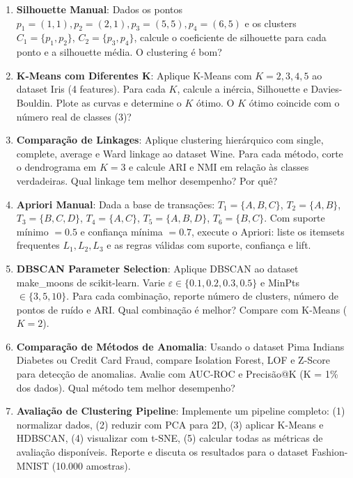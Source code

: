 \documentclass[12pt,a4paper]{article}
\begin{document}
\begin{enumerate}
  \item \textbf{Silhouette Manual}: Dados os pontos $p_1=(1,1), p_2=(2,1), p_3=(5,5), p_4=(6,5)$ e os clusters $C_1 = \{p_1, p_2\}$, $C_2 = \{p_3, p_4\}$, calcule o coeficiente de silhouette para cada ponto e a silhouette média. O clustering é bom?

  \item \textbf{K-Means com Diferentes K}: Aplique K-Means com $K = 2, 3, 4, 5$ ao dataset Iris (4 features). Para cada $K$, calcule a inércia, Silhouette e Davies-Bouldin. Plote as curvas e determine o $K$ ótimo. O $K$ ótimo coincide com o número real de classes (3)?

  \item \textbf{Comparação de Linkages}: Aplique clustering hierárquico com single, complete, average e Ward linkage ao dataset Wine. Para cada método, corte o dendrograma em $K=3$ e calcule ARI e NMI em relação às classes verdadeiras. Qual linkage tem melhor desempenho? Por quê?

  \item \textbf{Apriori Manual}: Dada a base de transações: $T_1=\{A,B,C\}$, $T_2=\{A,B\}$, $T_3=\{B,C,D\}$, $T_4=\{A,C\}$, $T_5=\{A,B,D\}$, $T_6=\{B,C\}$. Com suporte mínimo $= 0.5$ e confiança mínima $= 0.7$, execute o Apriori: liste os itemsets frequentes $L_1, L_2, L_3$ e as regras válidas com suporte, confiança e lift.

  \item \textbf{DBSCAN Parameter Selection}: Aplique DBSCAN ao dataset make\_moons de scikit-learn. Varie $\varepsilon \in \{0.1, 0.2, 0.3, 0.5\}$ e MinPts $\in \{3, 5, 10\}$. Para cada combinação, reporte número de clusters, número de pontos de ruído e ARI. Qual combinação é melhor? Compare com K-Means ($K=2$).

  \item \textbf{Comparação de Métodos de Anomalia}: Usando o dataset Pima Indians Diabetes ou Credit Card Fraud, compare Isolation Forest, LOF e Z-Score para detecção de anomalias. Avalie com AUC-ROC e Precisão@K (K = 1\% dos dados). Qual método tem melhor desempenho?

  \item \textbf{Avaliação de Clustering Pipeline}: Implemente um pipeline completo: (1) normalizar dados, (2) reduzir com PCA para 2D, (3) aplicar K-Means e HDBSCAN, (4) visualizar com t-SNE, (5) calcular todas as métricas de avaliação disponíveis. Reporte e discuta os resultados para o dataset Fashion-MNIST (10.000 amostras).
\end{enumerate}
\end{document}
